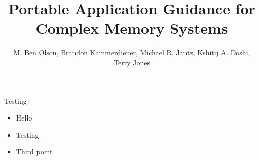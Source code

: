 \documentclass[final,hyperref={pdfpagelabels=false}]{beamer}
\title{Portable Application Guidance for Complex Memory Systems}
\author{M. Ben Olson, Brandon Kammerdiener, Michael R. Jantz, Kshitij A. Doshi, Terry Jones}
\begin{document}
\begin{frame}
  \maketitle
\end{frame}
\begin{frame}{Testing}
  \begin{itemize}
    \item Hello
    \item Testing
    \item Third point
  \end{itemize}
\end{frame}
\end{document}
